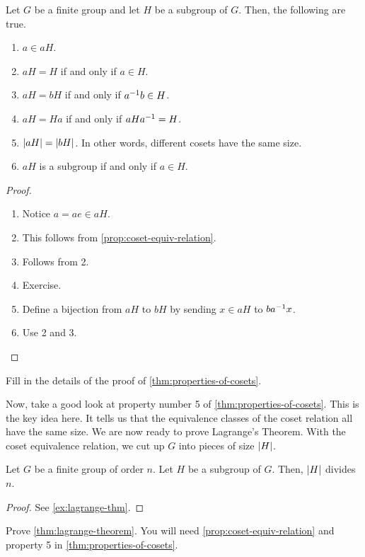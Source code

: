 \documentclass[./main.tex]{subfiles}
\begin{document}
\begin{theorem}
\label{thm:properties-of-cosets}
    Let $G$ be a finite group and let $H$ be a subgroup of $G$. Then, the following are true.

    \begin{enumerate}
        \item $a \in aH$.
        \item $aH = H$ if and only if $a \in H$.
        \item $aH = bH$ if and only if $a^{-1} b \in H$.
        \item $aH = Ha$ if and only if $aHa^{-1} = H$.
        \item $\abs{aH} = \abs{bH}$. In other words, different cosets have the same size.
        \item $aH$ is a subgroup if and only if $a \in H$.
    \end{enumerate}
\end{theorem}
\begin{proof}
    \begin{enumerate}
        \item Notice $a = ae \in aH$.
        \item This follows from \cref{prop:coset-equiv-relation}.
        \item Follows from 2.
        \item Exercise. 
        \item Define a bijection from $aH$ to $bH$ by sending $x \in aH$ to $ba^{-1} x$.
        \item Use 2 and 3.
    \end{enumerate}
\end{proof}
\begin{exercise}
    Fill in the details of the proof of \cref{thm:properties-of-cosets}.
\end{exercise}

Now, take a good look at property number 5 of \cref{thm:properties-of-cosets}.
This is the key idea here. It tells us that the equivalence classes of the coset
relation all have the same size. We are now ready to prove Lagrange's Theorem. With
the coset equivalence relation, we cut up $G$ into pieces of size $\abs{H}$. 
\begin{theorem}
\label{thm:lagrange-theorem}
    Let $G$ be a finite group of order $n$. Let $H$ be a subgroup of $G$. Then,
    $\abs{H}$ divides $n$.
\end{theorem}
\begin{proof}
    See \cref{ex:lagrange-thm}. 
\end{proof}
\begin{exercise}
\label{ex:lagrange-thm}
    Prove \cref{thm:lagrange-theorem}. You will need
    \cref{prop:coset-equiv-relation} and property 5 in
    \cref{thm:properties-of-cosets}.
\end{exercise}
\end{document}
